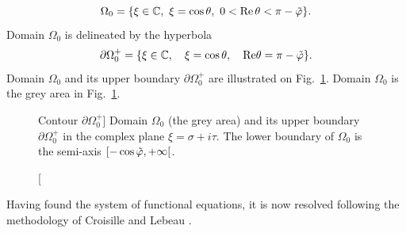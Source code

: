 \begin{equation}
\label{Domain_Omega0}
\Omega_0 =\{\xi\in\mathbb C, \ \xi=\cos \theta, \ 0< {\rm Re } \, \theta < \pi -\tilde{\varphi} \}.
\end{equation}
Domain $\Omega_0$ is delineated by the hyperbola 
\begin{equation}
\partial \Omega_0^+ = \{   \xi \in \mathbb{C}, \quad \xi = \cos \theta, \quad {\rm Re}  \theta = \pi - \tilde{\varphi} \}.
\end{equation}
Domain $\Omega_0$ and its upper boundary $\partial \Omega_0^+$ are illustrated on Fig.~\ref{chapter5:figure4}. Domain $\Omega_0$ is the grey area in Fig.~\ref{chapter5:figure4}.

\begin{figure}[h]
\centering
{}
\caption
[Contour $\partial \Omega_0^+$]
{Domain $\Omega_0$ (the grey area) and its upper boundary $\partial \Omega_0^+$ in the complex plane $\xi=\sigma+i\tau$. The lower boundary of $\Omega_0$ is the semi-axis $[-\cos \tilde{\varphi},+\infty[$.}
\label{chapter5:figure4}
\end{figure}
Having found the system of functional equations, it is now resolved following the methodology of Croisille and Lebeau \cite{CroisilleLebeau}.

